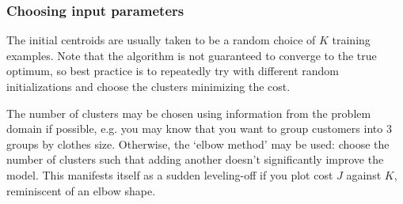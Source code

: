 \documentclass[a4paper,12pt]{article}
\theoremstyle{definition}
\begin{document}
\subsubsection{Choosing input parameters}

The initial centroids are usually taken to be a random choice of $K$ training examples. Note that the algorithm is not guaranteed to converge to the true optimum, so best practice is to repeatedly try with different random initializations and choose the clusters minimizing the cost.

The number of clusters may be chosen using information from the problem domain if possible, e.g. you may know that you want to group customers into 3 groups by clothes size. Otherwise, the `elbow method' may be used: choose the number of clusters such that adding another doesn't significantly improve the model. This manifests itself as a sudden leveling-off if you plot cost $J$ against $K$, reminiscent of an elbow shape.
\end{document}
